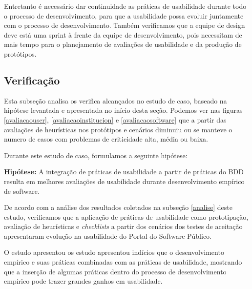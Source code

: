 Entretanto é necessário dar continuidade as práticas de usabilidade durante todo o processo de desenvolvimento, para que a usabilidade possa evoluir juntamente com o processo de desenvolvimento. Também verificamos que a equipe de design deve está uma sprint à frente da equipe de desenvolvimento, pois necessitam de mais tempo para o planejamento de avaliações de usabilidade e da produção de protótipos.



\subsection{Verificação}

Esta subseção analisa os verifica alcançados no estudo de caso, baseado na hipótese levantada e apresentada no início desta seção. Podemos ver nas figuras \ref{avaliacaouser}, \ref{avaliacaoinstitucion} e \ref{avaliacaosoftware} que a partir das avaliações de heurísticas nos protótipos e cenários diminuiu ou se manteve o numero de casos com problemas de criticidade alta, média ou baixa. 
	

Durante este estudo de caso, formulamos a seguinte hipótese:

\textbf{Hipótese: } A integração de práticas de usabilidade a partir de práticas do BDD resulta em melhores avaliações de usabilidade durante desenvolvimento empírico de software.

De acordo com a análise dos resultados coletados na subseção \ref{analise} deste estudo, verificamos que a aplicação de práticas de usabilidade como prototipação, avaliação de heurísticas e \textit{checklists} a partir dos cenários dos testes de aceitação apresentaram evolução na usabilidade do Portal do Software Público.


O estudo apresentou os estudo apresentou indícios que o desenvolvimento empírico	e suas práticas combinadas com as práticas de usabilidade, mostrando que a inserção de algumas práticas dentro do processo de desenvolvimento empírico pode trazer grandes ganhos em usabilidade.


